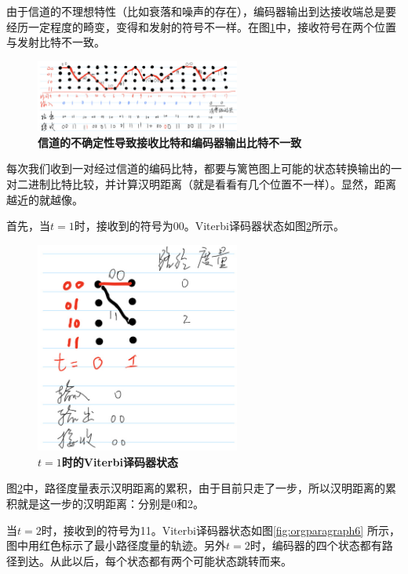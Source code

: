 \documentclass[10pt,a4paper,UTF8]{article}
\begin{document}
由于信道的不理想特性（比如衰落和噪声的存在），编码器输出到达接收端总是要经历一定程度的畸变，变得和发射的符号不一样。在图\ref{fig:orgparagraph4}中，接收符号在两个位置与发射比特不一致。

\begin{figure}[htb]
\centering
\includegraphics[width=0.6\textwidth]{../../img/20160101convolutionalReceiver.jpg}
\caption{\label{fig:orgparagraph4}
\textbf{信道的不确定性导致接收比特和编码器输出比特不一致}}
\end{figure}

每次我们收到一对经过信道的编码比特，都要与篱笆图上可能的状态转换输出的一对二进制比特比较，并计算汉明距离（就是看看有几个位置不一样）。显然，距离越近的就越像。

首先，当\(t=1\)时，接收到的符号为00。Viterbi译码器状态如图\ref{fig:orgparagraph5}所示。

\begin{figure}[htb]
\centering
\includegraphics[width=0.6\textwidth]{../../img/20160101ViterbiT0.jpg}
\caption{\label{fig:orgparagraph5}
\textbf{\(t=1\)时的Viterbi译码器状态}}
\end{figure}

图\ref{fig:orgparagraph5}中，路径度量表示汉明距离的累积，由于目前只走了一步，所以汉明距离的累积就是这一步的汉明距离：分别是0和2。

当\(t=2\)时，接收到的符号为11。Viterbi译码器状态如图\ref{fig:orgparagraph6} 所示，图中用红色标示了最小路径度量的轨迹。另外\(t=2\)时，编码器的四个状态都有路径到达。从此以后，每个状态都有两个可能状态跳转而来。
\end{document}
